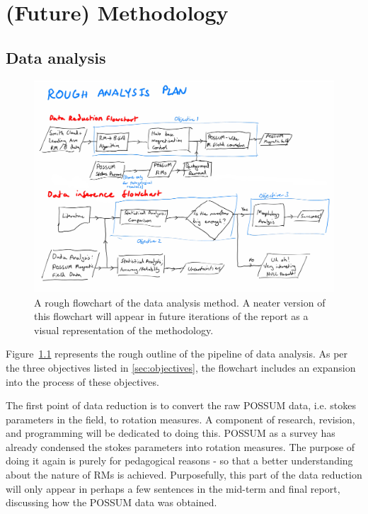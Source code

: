 \chapter{(Future) Methodology}
\label{cha:methodology}

\section{Data analysis}
\label{sec:method}

\begin{figure}[h]
  \label{fig:flowchart}
  \includegraphics[width=\columnwidth]{figs/flowchart.png}
  \caption{A rough flowchart of the data analysis method. A neater version of this flowchart will appear in future iterations of the report as a visual representation of the methodology.}
\end{figure}

Figure~\ref{fig:flowchart} represents the rough outline of the pipeline of data analysis. As per the three objectives listed in \ref{sec:objectives}, the flowchart includes an expansion into the process of these objectives.

The first point of data reduction is to convert the raw POSSUM data, i.e. stokes parameters in the field, to rotation measures. A component of research, revision, and programming will be dedicated to doing this. POSSUM as a survey has already condensed the stokes parameters into rotation measures. The purpose of doing it again is purely for pedagogical reasons - so that a better understanding about the nature of RMs is achieved. Purposefully, this part of the data reduction will only appear in perhaps a few sentences in the mid-term and final report, discussing how the POSSUM data was obtained.

